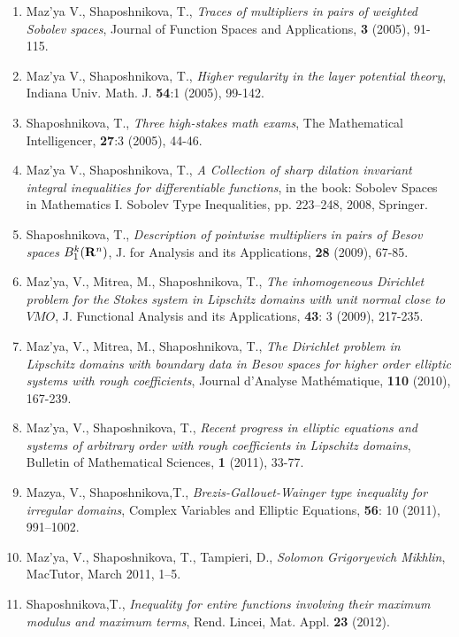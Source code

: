 \documentclass{article}
\begin{document}
\begin{enumerate}
\item Maz'ya V., Shaposhnikova, T., {\it Traces of multipliers in
pairs
of weighted Sobolev spaces},  Journal of Function Spaces
and Applications, {\bf 3} (2005), 91-115.

\item Maz'ya V., Shaposhnikova, T., {\it Higher regularity in the layer potential theory}, Indiana Univ.
Math. J. {\bf 54}:1 (2005), 99-142. 

\item Shaposhnikova, T., {\it Three high-stakes math exams},  The Mathematical Intelligencer, {\bf 27}:3 (2005), 44-46.

\item Maz'ya V., Shaposhnikova, T., {\it  A Collection of sharp dilation invariant integral inequalities
for differentiable functions}, in the book: Sobolev Spaces in Mathematics I. Sobolev Type Inequalities, pp. 223--248, 2008, Springer.

\item Shaposhnikova, T., 
{\it Description of pointwise multipliers in pairs of Besov spaces $B_1^k({\bf R}^n)$}, 
  J. for Analysis and its Applications, {\bf 28} (2009), 67-85.

 \item Maz'ya, V., Mitrea, M., Shaposhnikova, T., 
 {\it The inhomogeneous Dirichlet problem for the Stokes system in Lipschitz domains with unit normal close to $VMO$}, J.  Functional  Analysis and its Applications, {\bf 43}: 3 (2009), 217-235.


 \item Maz'ya, V., Mitrea, M., Shaposhnikova, T., 
 {\it The  Dirichlet problem in Lipschitz domains with boundary data in Besov spaces for higher order elliptic systems with rough coefficients}, 
{Journal d'Analyse Math\'ematique}, 
{\bf 110} (2010), 
{167-239}.

\item {Maz'ya, V., Shaposhnikova, T.}, 
{\it Recent progress in elliptic equations and systems of arbitrary order with rough coefficients in Lipschitz domains}, {Bulletin of Mathematical Sciences}, {\bf 1} (2011), 33-77. 

\item{Mazya, V., Shaposhnikova,T.}, 
{\it Brezis-Gallouet-Wainger type inequality for irregular domains}, 
  {Complex Variables and Elliptic Equations}, 
 {\bf 56}: {10} (2011),  {991--1002}. 

\item {Maz'ya, V., Shaposhnikova, T., Tampieri, D.}, 
{\it Solomon Grigoryevich Mikhlin}, 
 {MacTutor, March 2011}, {1--5}.

\item{Shaposhnikova,T.}, 
{\it Inequality for entire functions involving their maximum modulus and maximum terms}, Rend. Lincei, Mat. Appl. {\bf 23} (2012).


\end{enumerate}
\end{document}
